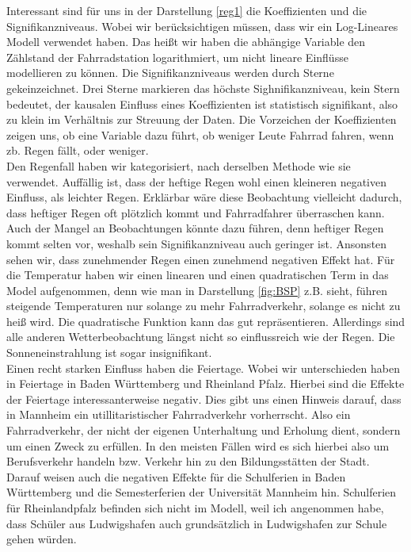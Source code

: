\documentclass[a4paper,12pt]{thesis}
\begin{document}
Interessant sind für uns in der Darstellung \ref{reg1} die Koeffizienten und die Signifikanzniveaus. Wobei wir berücksichtigen müssen, dass wir ein Log-Lineares Modell verwendet haben. Das heißt wir haben die abhängige Variable den Zählstand der Fahrradstation logarithmiert, um nicht lineare Einflüsse modellieren zu können. Die Signifikanzniveaus werden durch Sterne gekeinzeichnet. Drei Sterne markieren das höchste Sighnifikanzniveau, kein Stern bedeutet, der kausalen Einfluss eines Koeffizienten ist statistisch signifikant, also zu klein im Verhältnis zur Streuung der Daten. Die Vorzeichen der Koeffizienten zeigen uns, ob eine Variable dazu führt, ob weniger Leute Fahrrad fahren, wenn zb. Regen fällt, oder weniger.\\ 
Den Regenfall haben wir kategorisiert, nach derselben Methode wie sie \cite{Wessel2020} verwendet. Auffällig ist, dass der heftige Regen wohl einen kleineren negativen Einfluss, als leichter Regen. Erklärbar wäre diese Beobachtung vielleicht dadurch, dass heftiger Regen oft plötzlich kommt und Fahrradfahrer überraschen kann. Auch der Mangel an Beobachtungen könnte dazu führen, denn heftiger Regen kommt selten vor, weshalb sein Signifikanzniveau auch geringer ist. Ansonsten sehen wir, dass zunehmender Regen einen zunehmend negativen Effekt hat. Für die Temperatur haben wir einen linearen und einen quadratischen Term in das Model aufgenommen, denn wie man in Darstellung \ref{fig:BSP} z.B. sieht, führen steigende Temperaturen nur solange zu mehr Fahrradverkehr, solange es nicht zu heiß wird. Die quadratische Funktion kann das gut repräsentieren. Allerdings sind alle anderen Wetterbeobachtung längst nicht so einflussreich wie der Regen. Die Sonneneinstrahlung ist sogar insignifikant.\\
Einen recht starken Einfluss haben die Feiertage. Wobei wir unterschieden haben in Feiertage in Baden Württemberg und Rheinland Pfalz. Hierbei sind die Effekte der Feiertage interessanterweise negativ. Dies gibt uns einen Hinweis darauf, dass in Mannheim ein utillitaristischer Fahrradverkehr vorherrscht. Also ein Fahrradverkehr, der nicht der eigenen Unterhaltung und Erholung dient, sondern um einen Zweck zu erfüllen. In den meisten Fällen wird es sich hierbei also um Berufsverkehr handeln bzw. Verkehr hin zu den Bildungsstätten der Stadt. Darauf weisen auch die negativen Effekte für die Schulferien in Baden Württemberg und die Semesterferien der Universität Mannheim hin. Schulferien für Rheinlandpfalz befinden sich nicht im Modell, weil ich angenommen habe, dass Schüler aus Ludwigshafen auch grundsätzlich in Ludwigshafen zur Schule gehen würden.\\
\end{document}
